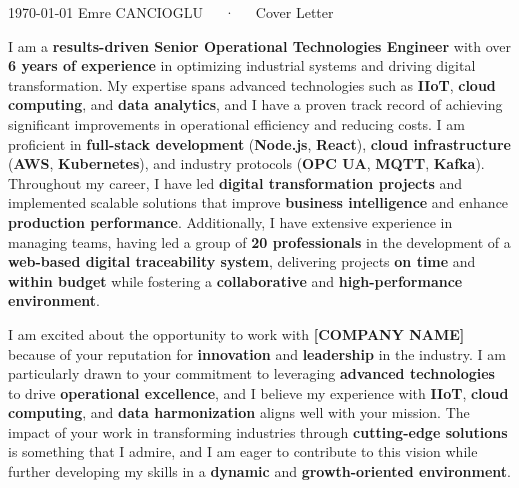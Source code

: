 \documentclass[11pt, a4paper]{awesome-cv}
\begin{document}
\makecvheader[R]

\makecvfooter
  {\today}
  {Emre CANCIOGLU~~~·~~~Cover Letter}
  {}

\makelettertitle


\begin{cvletter}

I am a \textbf{results-driven Senior Operational Technologies Engineer} with over \textbf{6 years of experience} in optimizing industrial systems and driving digital transformation. My expertise spans advanced technologies such as \textbf{IIoT}, \textbf{cloud computing}, and \textbf{data analytics}, and I have a proven track record of achieving significant improvements in operational efficiency and reducing costs. I am proficient in \textbf{full-stack development} (\textbf{Node.js}, \textbf{React}), \textbf{cloud infrastructure} (\textbf{AWS}, \textbf{Kubernetes}), and industry protocols (\textbf{OPC UA}, \textbf{MQTT}, \textbf{Kafka}). Throughout my career, I have led \textbf{digital transformation projects} and implemented scalable solutions that improve \textbf{business intelligence} and enhance \textbf{production performance}. Additionally, I have extensive experience in managing teams, having led a group of \textbf{20 professionals} in the development of a \textbf{web-based digital traceability system}, delivering projects \textbf{on time} and \textbf{within budget} while fostering a \textbf{collaborative} and \textbf{high-performance environment}.

I am excited about the opportunity to work with \textbf{[COMPANY NAME]} because of your reputation for \textbf{innovation} and \textbf{leadership} in the industry. I am particularly drawn to your commitment to leveraging \textbf{advanced technologies} to drive \textbf{operational excellence}, and I believe my experience with \textbf{IIoT}, \textbf{cloud computing}, and \textbf{data harmonization} aligns well with your mission. The impact of your work in transforming industries through \textbf{cutting-edge solutions} is something that I admire, and I am eager to contribute to this vision while further developing my skills in a \textbf{dynamic} and \textbf{growth-oriented environment}.


\end{cvletter}
\end{document}
